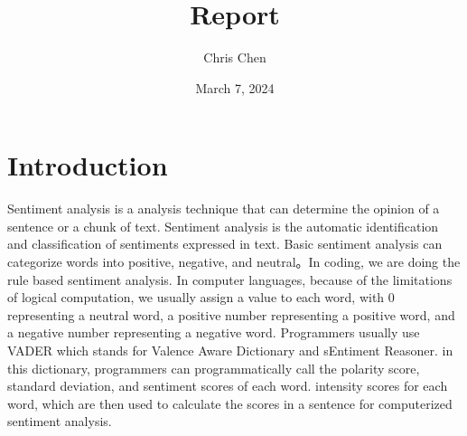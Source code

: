 \documentclass{article}
\title{Report}
\author{Chris Chen}
\date{March 7, 2024}
\begin{document}
\maketitle

\section{Introduction}
Sentiment analysis is a analysis technique that can determine the opinion of a sentence or a chunk of text. Sentiment analysis is the automatic identification and classification of sentiments expressed in text. Basic sentiment analysis can categorize words into positive, negative, and neutral。In coding, we are doing the rule based sentiment analysis. In computer languages, because of the limitations of logical computation, we usually assign a value to each word, with 0 representing a neutral word, a positive number representing a positive word, and a negative number representing a negative word. Programmers usually use VADER which stands for Valence Aware Dictionary and sEntiment Reasoner. in this dictionary, programmers can programmatically call the polarity score, standard deviation, and sentiment scores of each word. intensity scores for each word, which are then used to calculate the scores in a sentence for computerized sentiment analysis.
\end{document}
